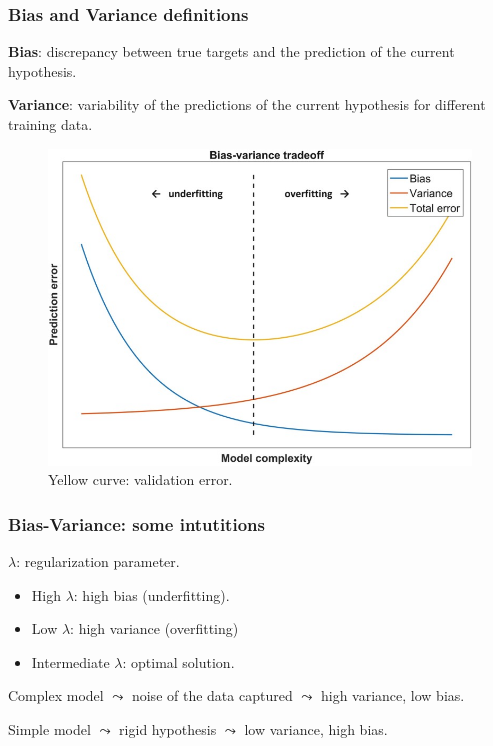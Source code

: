 \documentclass{beamer}
\begin{document}
	\begin{frame}
		\frametitle{Bias and Variance definitions}
		\textbf{Bias}: discrepancy between true targets and the prediction of the current hypothesis.
		
		\vspace{5mm}
		
		\textbf{Variance}: variability of the predictions of the current hypothesis for different training data.
		
		\begin{figure}
			\centering
			\includegraphics[scale=0.3]{images/bias-variance}
			\caption{Yellow curve: validation error.}
		\end{figure}
	\end{frame}

	\begin{frame}
		\frametitle{Bias-Variance: some intutitions}
		$\lambda$: regularization parameter.
		
		\vspace{5mm}
		
		\begin{itemize}
			\item High $\lambda$: high bias (underfitting).
			\item Low $\lambda$: high variance (overfitting)
			\item Intermediate $\lambda$: optimal solution.
		\end{itemize}
	
		\vspace{5mm}
		
		Complex model $\leadsto$ noise of the data captured $\leadsto$ high variance, low bias.
		
		\vspace{5mm}
		
		Simple model $\leadsto$ rigid hypothesis $\leadsto$ low variance, high bias.
	\end{frame}
\end{document}
